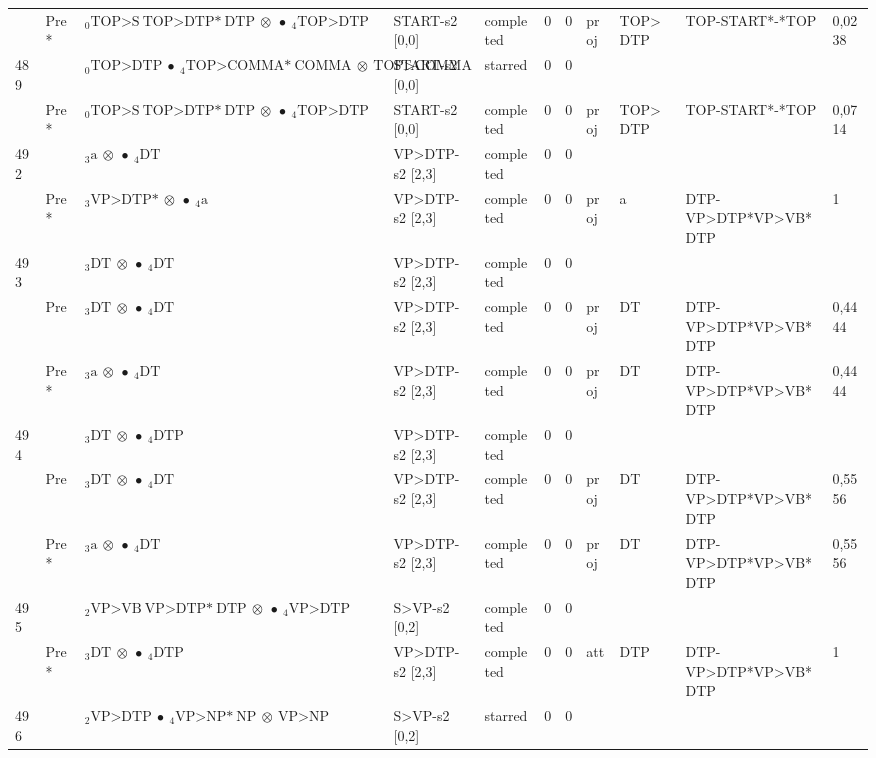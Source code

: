 \documentclass[10pt]{article}
\begin{document}
\begin{longtable}[htbp]{lllllllllll}
 & Pre *& $ {}_0 \textrm{TOP>S} \ \textrm{TOP>DTP*} \ \textrm{DTP} \  \otimes \  \bullet \ {}_{4} \textrm{TOP>DTP} $ & START-s2 [0,0] & completed & 0 & 0 & proj & TOP>DTP & TOP-START*-*TOP & 0,0238 \\ 
489 & & $ {}_0 \textrm{TOP>DTP} \  \bullet \ {}_{4} \textrm{TOP>COMMA*} \ \textrm{COMMA} \  \otimes \ \textrm{TOP>COMMA} $ & START-s2 [0,0] & starred & 0 & 0 & & & & \\ 
 & Pre *& $ {}_0 \textrm{TOP>S} \ \textrm{TOP>DTP*} \ \textrm{DTP} \  \otimes \  \bullet \ {}_{4} \textrm{TOP>DTP} $ & START-s2 [0,0] & completed & 0 & 0 & proj & TOP>DTP & TOP-START*-*TOP & 0,0714 \\ 
492 & & $ {}_3 \textrm{a} \  \otimes \  \bullet \ {}_{4} \textrm{DT} $ & VP>DTP-s2 [2,3] & completed & 0 & 0 & & & & \\ 
 & Pre *& $ {}_3 \textrm{VP>DTP*} \  \otimes \  \bullet \ {}_{4} \textrm{a} $ & VP>DTP-s2 [2,3] & completed & 0 & 0 & proj & a & DTP-VP>DTP*VP>VB*DTP & 1 \\ 
493 & & $ {}_3 \textrm{DT} \  \otimes \  \bullet \ {}_{4} \textrm{DT} $ & VP>DTP-s2 [2,3] & completed & 0 & 0 & & & & \\ 
 & Pre & $ {}_3 \textrm{DT} \  \otimes \  \bullet \ {}_{4} \textrm{DT} $ & VP>DTP-s2 [2,3] & completed & 0 & 0 & proj & DT & DTP-VP>DTP*VP>VB*DTP & 0,4444 \\ 
 & Pre *& $ {}_3 \textrm{a} \  \otimes \  \bullet \ {}_{4} \textrm{DT} $ & VP>DTP-s2 [2,3] & completed & 0 & 0 & proj & DT & DTP-VP>DTP*VP>VB*DTP & 0,4444 \\ 
494 & & $ {}_3 \textrm{DT} \  \otimes \  \bullet \ {}_{4} \textrm{DTP} $ & VP>DTP-s2 [2,3] & completed & 0 & 0 & & & & \\ 
 & Pre & $ {}_3 \textrm{DT} \  \otimes \  \bullet \ {}_{4} \textrm{DT} $ & VP>DTP-s2 [2,3] & completed & 0 & 0 & proj & DT & DTP-VP>DTP*VP>VB*DTP & 0,5556 \\ 
 & Pre *& $ {}_3 \textrm{a} \  \otimes \  \bullet \ {}_{4} \textrm{DT} $ & VP>DTP-s2 [2,3] & completed & 0 & 0 & proj & DT & DTP-VP>DTP*VP>VB*DTP & 0,5556 \\ 
495 & & $ {}_2 \textrm{VP>VB} \ \textrm{VP>DTP*} \ \textrm{DTP} \  \otimes \  \bullet \ {}_{4} \textrm{VP>DTP} $ & S>VP-s2 [0,2] & completed & 0 & 0 & & & & \\ 
 & Pre *& $ {}_3 \textrm{DT} \  \otimes \  \bullet \ {}_{4} \textrm{DTP} $ & VP>DTP-s2 [2,3] & completed & 0 & 0 & att & DTP & DTP-VP>DTP*VP>VB*DTP & 1 \\ 
496 & & $ {}_2 \textrm{VP>DTP} \  \bullet \ {}_{4} \textrm{VP>NP*} \ \textrm{NP} \  \otimes \ \textrm{VP>NP} $ & S>VP-s2 [0,2] & starred & 0 & 0 & & & & \\ 

\end{longtable}
\end{document}
